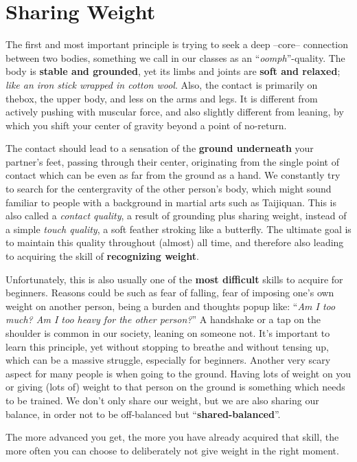 \section{Sharing Weight}\label{sec:sharing-weight}

The first and most important principle is trying to seek a deep --core-- connection between two bodies, something we call in our classes as an ``\textit{oomph}''-quality.
The body is \textbf{stable and grounded}, yet its limbs and joints are \textbf{soft and relaxed}; \textit{like an iron stick wrapped in cotton wool}.
Also, the contact is primarily on \gls{thebox}, the upper body, and less on the arms and legs.
It is different from actively pushing with muscular force, and also slightly different from leaning, by which you shift your center of gravity beyond a point of no-return.

The contact should lead to a sensation of the \textbf{ground underneath} your partner's feet, passing through their center, originating from the single point of contact which can be even as far from the ground as a hand.
We constantly try to search for the \gls{centergravity} of the other person's body, which might sound familiar to people with a background in martial arts such as Taijiquan.
This is also called a \textit{contact quality}, a result of grounding plus sharing weight, instead of a simple \textit{touch quality}, a soft feather stroking like a butterfly.
The ultimate goal is to maintain this quality throughout (almost) all time, and therefore also leading to acquiring the skill of \textbf{recognizing weight}.

Unfortunately, this is also usually one of the \textbf{most difficult} skills to acquire for beginners.
Reasons could be such as fear of falling, fear of imposing one's own weight on another person, being a burden and thoughts popup like: ``\textit{Am I too much? Am I too heavy for the other person?}''
A handshake or a tap on the shoulder is common in our society, leaning on someone not.
It's important to learn this principle, yet without stopping to breathe and without tensing up, which can be a massive struggle, especially for beginners.
Another very scary aspect for many people is when going to the ground.
Having lots of weight on you or giving (lots of) weight to that person on the ground is something which needs to be trained.
We don't only share our weight, but we are also sharing our balance, in order not to be off-balanced but ``\textbf{shared-balanced}''.

The more advanced you get, the more you have already acquired that skill, the more often you can choose to deliberately not give weight in the right moment.

